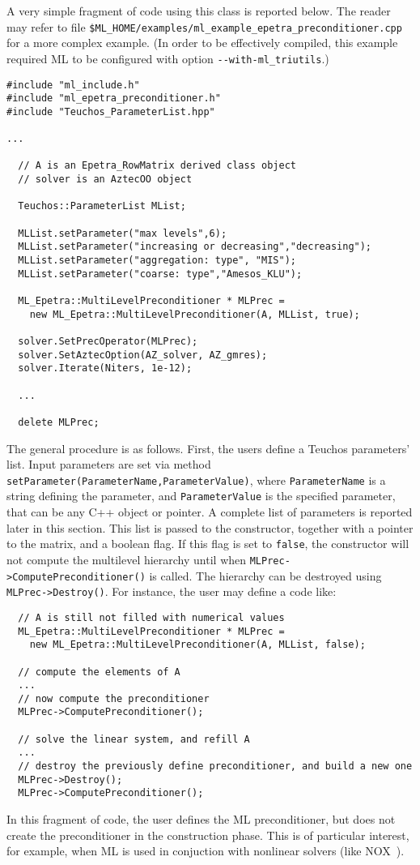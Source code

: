 A very simple fragment of code using this class is reported below. The
reader may refer to file
\verb!$ML_HOME/examples/ml_example_epetra_preconditioner.cpp! for a more
complex example. (In order to be effectively compiled, this example
required ML to be configured with option \verb!--with-ml_triutils!.)
\begin{verbatim}
#include "ml_include.h"
#include "ml_epetra_preconditioner.h"
#include "Teuchos_ParameterList.hpp"

...

  // A is an Epetra_RowMatrix derived class object
  // solver is an AztecOO object

  Teuchos::ParameterList MList;

  MLList.setParameter("max levels",6);
  MLList.setParameter("increasing or decreasing","decreasing");
  MLList.setParameter("aggregation: type", "MIS");
  MLList.setParameter("coarse: type","Amesos_KLU");
  
  ML_Epetra::MultiLevelPreconditioner * MLPrec = 
    new ML_Epetra::MultiLevelPreconditioner(A, MLList, true);

  solver.SetPrecOperator(MLPrec);
  solver.SetAztecOption(AZ_solver, AZ_gmres);
  solver.Iterate(Niters, 1e-12);

  ...

  delete MLPrec;
\end{verbatim}
The general procedure is as follows. First, the users define a Teuchos
parameters' list. Input parameters are set via method
\verb!setParameter(ParameterName,ParameterValue)!, where
\verb!ParameterName! is a string defining the parameter, and
\verb!ParameterValue! is the specified parameter, that can be any C++
object or pointer. A complete list of parameters is reported later in
this section. This list is passed to the constructor, together with a
pointer to the matrix, and a boolean flag.  If this flag is set to
\verb!false!, the constructor will not compute the multilevel hierarchy
until when \verb!MLPrec->ComputePreconditioner()! is called. The
hierarchy can be destroyed using \verb!MLPrec->Destroy()!.  For
instance, the user may define a code like:
\begin{verbatim}
  // A is still not filled with numerical values
  ML_Epetra::MultiLevelPreconditioner * MLPrec = 
    new ML_Epetra::MultiLevelPreconditioner(A, MLList, false);
  
  // compute the elements of A
  ...
  // now compute the preconditioner
  MLPrec->ComputePreconditioner();

  // solve the linear system, and refill A
  ...
  // destroy the previously define preconditioner, and build a new one
  MLPrec->Destroy();
  MLPrec->ComputePreconditioner();
\end{verbatim}
In this fragment of code, the user defines the ML preconditioner, but
does not create the preconditioner in the construction phase. This is of
particular interest, for example, when ML is used in conjuction with
nonlinear solvers (like NOX~\cite{NOX-home-page}).

